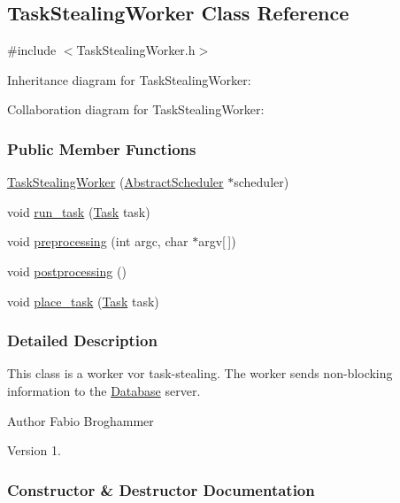 \hypertarget{a00039}{}\subsection{Task\+Stealing\+Worker Class Reference}
\label{a00039}


{\ttfamily \#include $<$Task\+Stealing\+Worker.\+h$>$}



Inheritance diagram for Task\+Stealing\+Worker\+:


Collaboration diagram for Task\+Stealing\+Worker\+:
\subsubsection*{Public Member Functions}
\begin{DoxyCompactItemize}
\item 
\hyperlink{a00039_a51b370c7dd7e811fd4f0bf1bb35c6504}{Task\+Stealing\+Worker} (\hyperlink{a00004}{Abstract\+Scheduler} $\ast$scheduler)
\item 
void \hyperlink{a00039_aa3dd8530803573c2029dcf2c32d4d5ae}{run\+\_\+task} (\hyperlink{a00002}{Task} task)
\item 
void \hyperlink{a00039_a4bdc52bab41bf39d44191b419e879d4b}{preprocessing} (int argc, char $\ast$argv\mbox{[}$\,$\mbox{]})
\item 
void \hyperlink{a00039_ac0d27069ce08e1a7da4ff9245091adf4}{postprocessing} ()
\item 
void \hyperlink{a00039_afce5be5da1c09d4dce30d16fa12a896f}{place\+\_\+task} (\hyperlink{a00002}{Task} task)
\end{DoxyCompactItemize}


\subsubsection{Detailed Description}
This class is a worker vor task-\/stealing. The worker sends non-\/blocking information to the \hyperlink{a00010}{Database} server.

\begin{DoxyAuthor}{Author}
Fabio Broghammer 
\end{DoxyAuthor}
\begin{DoxyVersion}{Version}
1. 
\end{DoxyVersion}


\subsubsection{Constructor \& Destructor Documentation}
\hypertarget{a00039_a51b370c7dd7e811fd4f0bf1bb35c6504}{}
